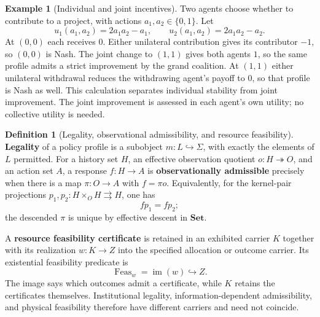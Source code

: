 \documentclass[11pt,a4paper]{article}
\numberwithin{equation}{section}
\theoremstyle{definition}
\newtheorem{definition}[theorem]{Definition}
\newtheorem{example}[theorem]{Example}
\theoremstyle{remark}
\theoremstyle{plain}
\begin{document}
\begin{example}[Individual and joint incentives]
\label{ex:egt-economic-orientation}
Two agents choose whether to contribute to a project, with actions
$a_1,a_2\in\{0,1\}$. Let
\[
 u_1(a_1,a_2)=2a_1a_2-a_1,\qquad
 u_2(a_1,a_2)=2a_1a_2-a_2.
\]
At $(0,0)$ each receives $0$. Either unilateral contribution gives its
contributor $-1$, so $(0,0)$ is Nash. The joint change to $(1,1)$ gives both
agents $1$, so the same profile admits a strict improvement by the
grand coalition. At $(1,1)$ either unilateral withdrawal reduces the
withdrawing agent's payoff to $0$, so that profile is Nash as well.
This calculation separates individual stability from joint improvement.
The joint improvement is assessed in each agent's own utility; no
collective utility is needed.
\end{example}

\begin{definition}[Legality, observational admissibility, and resource feasibility]
\label{def:egt-choice-restrictions}
\textbf{Legality} of a policy profile is a subobject
$m:L\hookrightarrow\Sigma$, with exactly the elements of $L$ permitted.
For a history set $H$, an effective observation quotient
$o:H\twoheadrightarrow O$, and an action set $A$, a response $f:H\to A$
is \textbf{observationally admissible} precisely when there is a map
$\pi:O\to A$ with $f=\pi o$. Equivalently, for the kernel-pair
projections $p_1,p_2:H\times_OH\rightrightarrows H$, one has
\[
 fp_1=fp_2;
\]
the descended $\pi$ is unique by effective descent in $\mathbf{Set}$.

A \textbf{resource feasibility certificate} is retained in an exhibited
carrier $K$ together with its realization $w:K\to Z$ into the specified
allocation or outcome carrier. Its existential feasibility predicate is
\[
 \operatorname{Feas}_w=\operatorname{im}(w)\hookrightarrow Z.
\]
The image says which outcomes admit a certificate, while $K$ retains the
certificates themselves. Institutional legality, information-dependent
admissibility, and physical feasibility therefore have different carriers
and need not coincide.
\end{definition}
\end{document}
